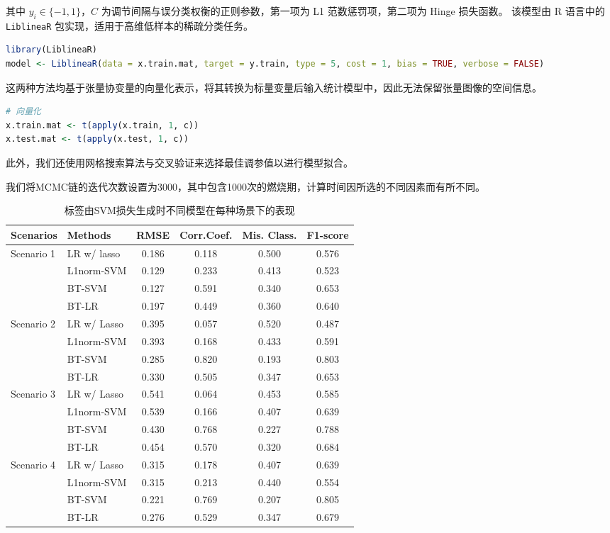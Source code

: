 \documentclass[AutoFakeBold]{LZUThesis}
\begin{document}
其中 \( y_i \in \{-1, 1\} \)，\(C\) 为调节间隔与误分类权衡的正则参数，第一项为 L1 范数惩罚项，第二项为 Hinge 损失函数。
该模型由 R 语言中的 \texttt{LiblineaR} 包实现，适用于高维低样本的稀疏分类任务。

\begin{lstlisting}[language=R]
library(LiblineaR)
model <- LiblineaR(data = x.train.mat, target = y.train, type = 5, cost = 1, bias = TRUE, verbose = FALSE)
\end{lstlisting}

这两种方法均基于张量协变量的向量化表示，将其转换为标量变量后输入统计模型中，因此无法保留张量图像的空间信息。
\begin{lstlisting}[language=R]
# 向量化
x.train.mat <- t(apply(x.train, 1, c))
x.test.mat <- t(apply(x.test, 1, c))
\end{lstlisting}
此外，我们还使用网格搜索算法与交叉验证来选择最佳调参值以进行模型拟合。

我们将MCMC链的迭代次数设置为3000，其中包含1000次的燃烧期，计算时间因所选的不同因素而有所不同。
\begin{table}[h!]
	\centering
	\caption{标签由SVM损失生成时不同模型在每种场景下的表现}
	\label{tab:performance_threeline SVM}
	\begin{tabular}{llcccc}
		\toprule 
		\textbf{Scenarios} & \textbf{Methods} & \textbf{RMSE} & \textbf{Corr.Coef.} & \textbf{Mis. Class.} & \textbf{F1-score} \\
		\midrule
		\multirow{4}{*}{Scenario 1} & LR w/ lasso & 0.186 & 0.118 & 0.500 & 0.576 \\
		& L1norm-SVM & 0.129 & 0.233 & 0.413 & 0.523 \\
		& BT-SVM & 0.127 & 0.591 & 0.340 & 0.653 \\
		& BT-LR & 0.197 & 0.449 & 0.360 & 0.640 \\
		
		\multirow{4}{*}{Scenario 2} & LR w/ Lasso & 0.395 & 0.057 & 0.520 & 0.487 \\
		& L1norm-SVM & 0.393 & 0.168 & 0.433 & 0.591 \\
		& BT-SVM & 0.285 & 0.820 & 0.193 & 0.803 \\
		& BT-LR & 0.330 & 0.505 & 0.347 & 0.653 \\
		
		\multirow{4}{*}{Scenario 3} & LR w/ Lasso & 0.541 & 0.064 & 0.453 & 0.585 \\
		& L1norm-SVM & 0.539 & 0.166 & 0.407 & 0.639 \\
		& BT-SVM & 0.430 & 0.768 & 0.227 & 0.788 \\
		& BT-LR & 0.454 & 0.570 & 0.320 & 0.684 \\
		
		\multirow{4}{*}{Scenario 4} & LR w/ Lasso & 0.315 & 0.178 & 0.407 & 0.639 \\
		& L1norm-SVM & 0.315 & 0.213 & 0.440 & 0.554 \\
		& BT-SVM & 0.221 & 0.769 & 0.207 & 0.805 \\
		& BT-LR & 0.276 & 0.529 & 0.347 & 0.679 \\
		\bottomrule
	\end{tabular}
\end{table}
\end{document}

